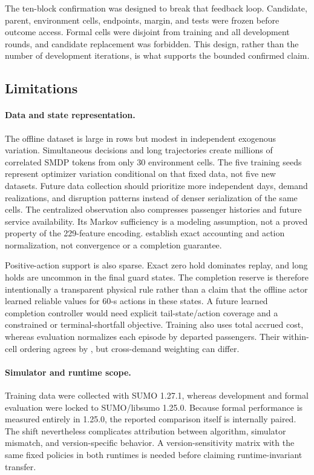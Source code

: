 The ten-block confirmation was designed to break that feedback loop. Candidate,
parent, environment cells, endpoints, margin, and tests were frozen before
outcome access. Formal cells were disjoint from training and all development
rounds, and candidate replacement was forbidden. This design, rather than the
number of development iterations, is what supports the bounded confirmed
claim.

\subsection{Limitations}
\label{sec:discussion:limitations}

\paragraph{Data and state representation.}

The offline dataset is large in rows but modest in independent exogenous
variation. Simultaneous decisions and long trajectories create millions of
correlated SMDP tokens from only 30 environment cells. The five training seeds
represent optimizer variation conditional on that fixed data, not five new
datasets. Future data collection should prioritize more independent days,
demand realizations, and disruption patterns instead of denser serialization of
the same cells. The centralized observation also compresses passenger
histories and future service availability. Its Markov sufficiency is a
modeling assumption, not a proved property of the 229-feature encoding.
 establish exact accounting and action
normalization, not convergence or a completion guarantee.

Positive-action support is also sparse. Exact zero hold dominates replay, and
long holds are uncommon in the final guard states. The completion reserve is
therefore intentionally a transparent physical rule rather than a claim that
the offline actor learned reliable values for 60-s actions in these states. A
future learned completion controller would need explicit tail-state/action
coverage and a constrained or terminal-shortfall objective. Training also uses
total accrued cost, whereas evaluation normalizes each episode by departed
passengers. Their within-cell ordering agrees by , but
cross-demand weighting can differ.

\paragraph{Simulator and runtime scope.}
Training data were collected with SUMO 1.27.1, whereas development and formal
evaluation were locked to SUMO/libsumo 1.25.0. Because formal performance is
measured entirely in 1.25.0, the reported comparison itself is internally
paired. The shift nevertheless complicates attribution between algorithm,
simulator mismatch, and version-specific behavior. A version-sensitivity matrix
with the same fixed policies in both runtimes is needed before claiming
runtime-invariant transfer.

